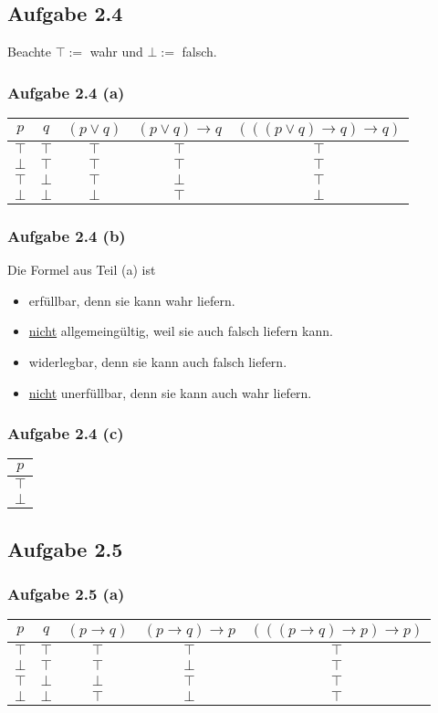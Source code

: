 \subsection{Aufgabe 2.4}
Beachte $\top:=$ wahr und $\bot:=$ falsch.

\subsubsection{Aufgabe 2.4 (a)}
\begin{tabular}{c|c||c|c|c}
	$p$ & $q$ & $(p\vee q)$ & $(p\vee q)\to q$ & $(((p\vee q)\to q)\to q)$\\ \hline
	$\top$ & $\top$ & $\top$ & $\top$ & $\top$\\
	$\bot$ & $\top$ & $\top$ & $\top$ & $\top$\\
	$\top$ & $\bot$ & $\top$ & $\bot$ & $\top$\\
	$\bot$ & $\bot$ & $\bot$ & $\top$ & $\bot$
\end{tabular}

\subsubsection{Aufgabe 2.4 (b)}
Die Formel aus Teil (a) ist
\begin{itemize}
	\item erfüllbar, denn sie kann wahr liefern.
	\item \underline{nicht} allgemeingültig, weil sie auch falsch liefern kann.
	\item widerlegbar, denn sie kann auch falsch liefern.
	\item \underline{nicht} unerfüllbar, denn sie kann auch wahr liefern.
\end{itemize}

\subsubsection{Aufgabe 2.4 (c)}
\begin{tabular}{c}
	$p$\\ \hline
	$\top$\\
	$\bot$
\end{tabular}

\subsection{Aufgabe 2.5}
\subsubsection{Aufgabe 2.5 (a)}
\begin{tabular}{c|c||c|c|c}
	$p$ & $q$ & $(p\to q)$ & $(p\to q)\to p$ & $(((p\to q)\to p)\to p)$\\ \hline
	$\top$ & $\top$ & $\top$ & $\top$ & $\top$ \\
	$\bot$ & $\top$ & $\top$ & $\bot$ & $\top$ \\
	$\top$ & $\bot$ & $\bot$ & $\top$ & $\top$\\
	$\bot$ & $\bot$ & $\top$ & $\bot$ & $\top$
\end{tabular}\\

